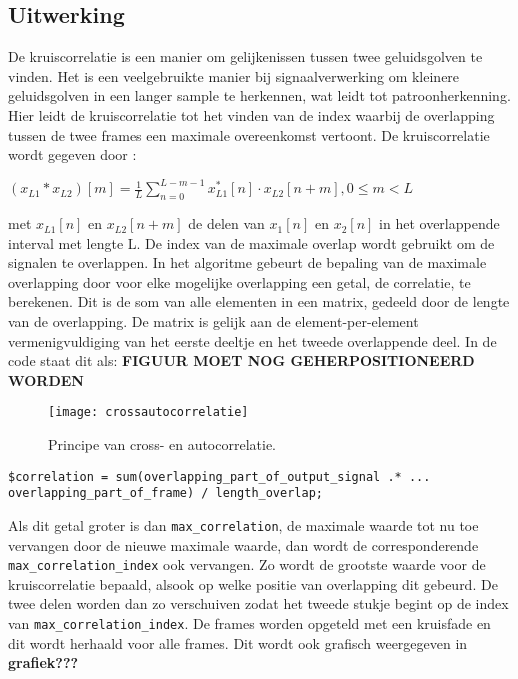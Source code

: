 \documentclass[12pt]{report}
\begin{document}
\subsection{Uitwerking}
De kruiscorrelatie is een manier om gelijkenissen tussen twee geluidsgolven te vinden. Het is een veelgebruikte manier bij signaalverwerking om kleinere geluidsgolven in een langer sample te herkennen, wat leidt tot patroonherkenning. Hier leidt de kruiscorrelatie tot het vinden van de index waarbij de overlapping tussen de twee frames een maximale overeenkomst vertoont.
De kruiscorrelatie wordt gegeven door :
\begin{center}
$(x_{L1}*x_{L2})[m]=\frac{1}{L} \sum\limits_{n=0}^{L-m-1}  x_{L1}^{*}[n]\cdot x_{L2}[n+m], 0 \le m < L $
\end{center}
met $x_{L1}[n]$ en $x_{L2}[n+m]$ de delen van $x_{1}[n]$ en $x_{2}[n]$ in het overlappende interval met lengte L. De index van de maximale overlap wordt gebruikt om de signalen te overlappen.
In het algoritme gebeurt de bepaling van de maximale overlapping door voor elke mogelijke overlapping een getal, de correlatie, te berekenen. Dit is de som van alle elementen in een matrix, gedeeld door de lengte van de overlapping. De matrix is gelijk aan de element-per-element vermenigvuldiging van het eerste deeltje en het tweede overlappende deel. In de code staat dit als:
\textbf{FIGUUR MOET NOG GEHERPOSITIONEERD WORDEN}
\begin{figure}
\centering
\texttt{[image: crossautocorrelatie]}
\caption{Principe van cross- en autocorrelatie.}
\label{fig:crosscorrelatie}
\end{figure}



\begin{verbatim}
$correlation = sum(overlapping_part_of_output_signal .* ...
overlapping_part_of_frame) / length_overlap;
\end{verbatim}

Als dit getal groter is dan \verb|max_correlation|, de maximale waarde tot nu toe  vervangen door de nieuwe maximale waarde, dan wordt de corresponderende \verb|max_correlation_index| ook vervangen.
Zo wordt de grootste waarde voor de kruiscorrelatie bepaald, alsook op welke positie van overlapping dit gebeurd. De twee delen worden dan zo verschuiven zodat het tweede stukje begint op de index van \verb|max_correlation_index|. De frames worden opgeteld met een kruisfade en dit wordt herhaald voor alle frames. Dit wordt ook grafisch weergegeven in \textbf{grafiek???}
\end{document}
